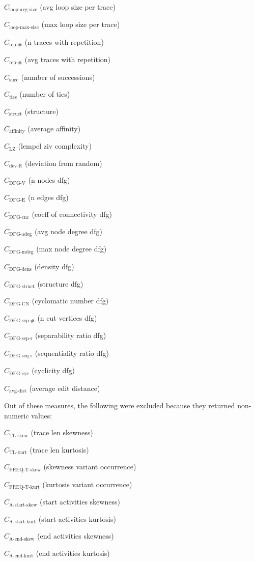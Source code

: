 \documentclass[a4paper]{article}
\newcommand{\startskewname}{\text{A-start-skew}}
\newcommand{\startskew}{C_{\startskewname}}
\newcommand{\startkurtname}{\text{A-start-kurt}}
\newcommand{\startkurt}{C_{\startkurtname}}
\newcommand{\lastskewname}{\text{A-end-skew}}
\newcommand{\lastskew}{C_{\lastskewname}}
\newcommand{\lastkurtname}{\text{A-end-kurt}}
\newcommand{\lastkurt}{C_{\lastkurtname}}
\newcommand{\tlskewnessname}{\text{TL-skew}}
\newcommand{\tlskewness}{C_{\tlskewnessname}}
\newcommand{\tlkurtosisname}{\text{TL-kurt}}
\newcommand{\tlkurtosis}{C_{\tlkurtosisname}}
\newcommand{\freqskewname}{\text{FREQ-T-skew}}
\newcommand{\freqskew}{C_{\freqskewname}}
\newcommand{\freqkurtname}{\text{FREQ-T-kurt}}
\newcommand{\freqkurt}{C_{\freqkurtname}}
\newcommand{\loopavgsizename}{\text{loop-avg-size}}
\newcommand{\loopavgsize}{C_{\loopavgsizename}}
\newcommand{\loopmaxsizename}{\text{loop-max-size}}
\newcommand{\loopmaxsize}{C_{\loopmaxsizename}}
\newcommand{\repnumname}{\text{rep-\#}}
\newcommand{\repnum}{C_{\repnumname}}
\newcommand{\reprelnum}{C_{\repnumname}}
\newcommand{\dfgnodesname}{\text{DFG-V}}
\newcommand{\dfgnodes}{C_{\dfgnodesname}}
\newcommand{\dfgedgesname}{\text{DFG-E}}
\newcommand{\dfgedges}{C_{\dfgedgesname}}
\newcommand{\dfgcncname}{\text{DFG-cnc}}
\newcommand{\dfgcnc}{C_{\dfgcncname}}
\newcommand{\dfgavgdegname}{\text{DFG-adeg}}
\newcommand{\dfgavgdeg}{C_{\dfgavgdegname}}
\newcommand{\dfgmaxdegname}{\text{DFG-mdeg}}
\newcommand{\dfgmaxdeg}{C_{\dfgmaxdegname}}
\newcommand{\dfgdensname}{\text{DFG-dens}}
\newcommand{\dfgdens}{C_{\dfgdensname}}
\newcommand{\dfgstructname}{\text{DFG-struct}}
\newcommand{\dfgstruct}{C_{\dfgstructname}}
\newcommand{\dfgcycnumbername}{\text{DFG-CN}}
\newcommand{\dfgcycnumber}{C_{\dfgcycnumbername}}
\newcommand{\dfgsepnumname}{\text{DFG-sep-\#}}
\newcommand{\dfgsepnum}{C_{\dfgsepnumname}}
\newcommand{\dfgseprationame}{\text{DFG-sep-r}}
\newcommand{\dfgsepratio}{C_{\dfgseprationame}}
\newcommand{\dfgseqrationame}{\text{DFG-seq-r}}
\newcommand{\dfgseqratio}{C_{\dfgseqrationame}}
\newcommand{\dfgcycname}{\text{DFG-cyc}}
\newcommand{\dfgcyc}{C_{\dfgcycname}}
\newcommand{\numberofneighborhoodsname}{\text{succ}}
\newcommand{\numberofneighborhoods}{C_{\numberofneighborhoodsname}}
\newcommand{\numberoftiesname}{\text{ties}}
\newcommand{\numberofties}{C_{\numberoftiesname}}
\newcommand{\lempelzivname}{\text{LZ}}
\newcommand{\lempelziv}{C_{\lempelzivname}}
\newcommand{\structurename}{\text{struct}}
\newcommand{\structure}{C_{\structurename}}
\newcommand{\affinityname}{\text{affinity}}
\newcommand{\affinity}{C_{\affinityname}}
\newcommand{\deviationfromrandomname}{\text{dev-R}}
\newcommand{\deviationfromrandom}{C_{\deviationfromrandomname}}
\newcommand{\avgdistname}{\text{avg-dist}}
\newcommand{\avgdist}{C_{\avgdistname}}
\begin{document}
\begin{compactenum}
\item $\loopavgsize$ (avg loop size per trace)
\item $\loopmaxsize$ (max loop size per trace)
\item $\repnum$ (n traces with repetition)
\item $\reprelnum$ (avg traces with repetition)
\item $\numberofneighborhoods$ (number of successions)
\item $\numberofties$ (number of ties)
\item $\structure$ (structure)
\item $\affinity$ (average affinity)
\item $\lempelziv$ (lempel ziv complexity)
\item $\deviationfromrandom$ (deviation from random)
\item $\dfgnodes$ (n nodes dfg)
\item $\dfgedges$ (n edges dfg)
\item $\dfgcnc$ (coeff of connectivity dfg)
\item $\dfgavgdeg$ (avg node degree dfg)
\item $\dfgmaxdeg$ (max node degree dfg)
\item $\dfgdens$ (density dfg)
\item $\dfgstruct$ (structure dfg)
\item $\dfgcycnumber$ (cyclomatic number dfg)
\item $\dfgsepnum$ (n cut vertices dfg)
\item $\dfgsepratio$ (separability ratio dfg)
\item $\dfgseqratio$ (sequentiality ratio dfg)
\item $\dfgcyc$ (cyclicity dfg)
\item $\avgdist$ (average edit distance)
\end{compactenum}

\bigskip
\noindent
Out of these measures, the following were excluded because they returned non-numeric values:
\begin{compactenum}
\item $\tlskewness$ (trace len skewness)
\item $\tlkurtosis$ (trace len kurtosis)
\item $\freqskew$ (skewness variant occurrence)
\item $\freqkurt$ (kurtosis variant occurrence)
\item $\startskew$ (start activities skewness)
\item $\startkurt$ (start activities kurtosis)
\item $\lastskew$ (end activities skewness)
\item $\lastkurt$ (end activities kurtosis)
\end{compactenum}
\end{document}
